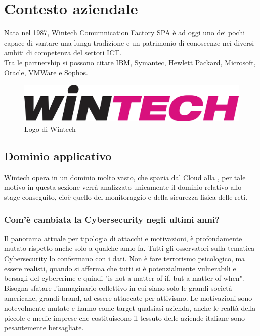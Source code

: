 \documentclass[Tesi.tex]{subfiles}
\begin{document}
\chapter{Contesto aziendale}

Nata nel 1987, Wintech Comumnication Factory SPA è ad oggi uno dei pochi  capace di vantare una lunga tradizione e un patrimonio di conoscenze nei diversi ambiti di competenza del settori ICT. \\
Tra le partnership si possono citare IBM, Symantec, Hewlett Packard, Microsoft, Oracle, VMWare e Sophos.
\begin{figure}[H]
	\centering
	\includegraphics[width=0.7\linewidth]{"images/LogoWintech"}
	\caption{Logo di Wintech}
	\label{fig:Logo di Wintech}
\end{figure}

\section{Dominio applicativo}
Wintech opera in un dominio molto vasto, che spazia dal Cloud alla , per tale motivo in questa sezione verrà analizzato unicamente il dominio relativo allo stage conseguito, cioè quello del monitoraggio e della sicurezza fisica delle reti. \\

\subsection{Com'è cambiata la Cybersecurity negli ultimi anni?}
Il panorama attuale per tipologia di attacchi e motivazioni, è profondamente mutato rispetto anche solo a qualche anno fa. Tutti gli osservatori sulla tematica Cybersecurity lo confermano con i dati. Non è fare terrorismo psicologico, ma essere realisti, quando si afferma che tutti si è potenzialmente vulnerabili e bersagli del cybercrime e quindi "is not a matter of if, but a matter of when". Bisogna sfatare l'immaginario collettivo in cui siano solo le grandi società americane, grandi brand, ad essere attaccate per attivismo. Le motivazioni sono notevolmente mutate e hanno come target qualsiasi azienda, anche le realtà della piccole e medie imprese che costituiscono il tessuto delle aziende italiane sono pesantemente bersagliate.
\end{document}
